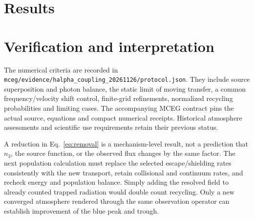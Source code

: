 \documentclass[11pt]{article}
\begin{document}
\section{Results}


\section{Verification and interpretation}
The numerical criteria are recorded in
\texttt{mceg/evidence/halpha\_coupling\_20261126/protocol.json}.
They include source superposition and photon balance, the static limit of
moving transfer, a common frequency/velocity shift control, finite-grid
refinements, normalized recycling probabilities and limiting cases.
The accompanying MCEG contract pins the actual source, equations and
compact numerical receipts. Historical atmosphere assessments and scientific
use requirements retain their previous status.

A reduction in Eq.~\eqref{eq:removal} is a mechanism-level result, not a
prediction that $n_3$, the source function, or the observed flux changes by
the same factor. The next population calculation must replace the selected
escape/shielding rates consistently with the new transport, retain collisional
and continuum rates, and recheck energy and population balance. Simply adding
the resolved field to already counted trapped radiation would double count
recycling. Only a new converged atmosphere rendered through the same
observation operator can establish improvement of the blue peak and trough.
\end{document}
